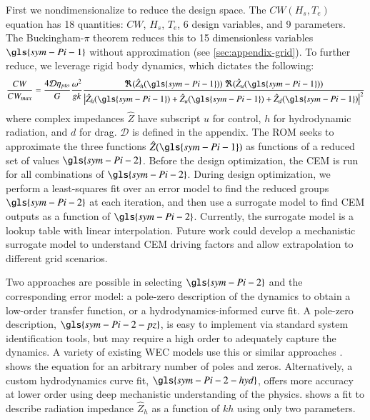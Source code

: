 First we nondimensionalize to reduce the design space.
The $CW(H_s,T_e)$ equation has 18 quantities: $CW$, $H_s$, $T_e$, 6 design variables, and 9 parameters.
The Buckingham-$\pi$ theorem reduces this to 15 dimensionless variables $\gls{sym-Pi-1}$ without approximation (see \cref{sec:appendix-grid}).
To further reduce, we leverage rigid body dynamics, which dictates the following:
\begin{equation}
    \label{eq:CW-fraction}
    \frac{CW}{CW_{max}} = \frac{4 \mathcal{D}\eta_{pto}}{G} \frac{\omega^2}{g k}  \frac{\Re(\hat{Z}_h(\gls{sym-Pi-1}))~ \Re(\hat{Z}_u(\gls{sym-Pi-1}))}{\left|\hat{Z}_h(\gls{sym-Pi-1})+\hat{Z}_u(\gls{sym-Pi-1})+\hat{Z}_d(\gls{sym-Pi-1})\right|^2}
\end{equation}
where complex impedances $\hat{Z}$ have subscript $u$ for control, $h$ for hydrodynamic radiation, and $d$ for drag.
$\mathcal{D}$ is defined in the appendix.
The ROM seeks to approximate the three functions $\hat{Z}(\gls{sym-Pi-1})$ as functions of a reduced set of values $\gls{sym-Pi-2}$.
Before the design optimization, the CEM is run for all combinations of $\gls{sym-Pi-2}$.
During design optimization, we perform a least-squares fit over an error model to find the reduced groups $\gls{sym-Pi-2}$ at each iteration, and then use a surrogate model to find CEM outputs as a function of $\gls{sym-Pi-2}$. 
Currently, the surrogate model is a lookup table with linear interpolation.
Future work could develop a mechanistic surrogate model to understand CEM driving factors and allow extrapolation to different grid scenarios.

Two approaches are possible in selecting $\gls{sym-Pi-2}$ and the corresponding error model: a pole-zero description of the dynamics to obtain a low-order transfer function, or a hydrodynamics-informed curve fit.
A pole-zero description, $\gls{sym-Pi-2-pz}$, is easy to implement via standard system identification tools, but may require a high order to adequately capture the dynamics. 
A variety of existing WEC models use this \cite{bacelli_system_2017} or similar approaches \cite{kristiansen_state-space_2005}. 
 shows the equation for an arbitrary number of poles and zeros.
Alternatively, a custom hydrodynamics curve fit, $\gls{sym-Pi-2-hyd}$, offers more accuracy at lower order using deep mechanistic understanding of the physics.
 shows a fit to describe radiation impedance $\hat{Z}_h$ as a function of $kh$ using only two parameters.

